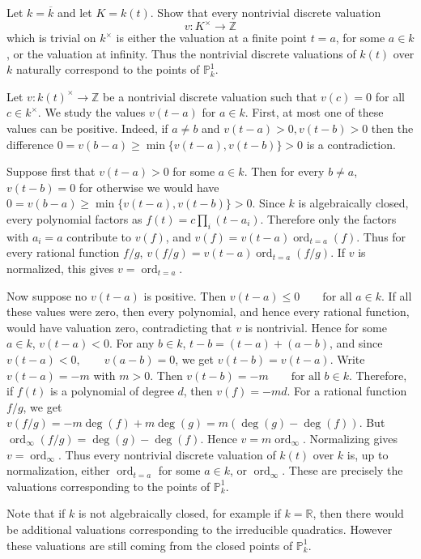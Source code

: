 \documentclass[12pt]{article}
\begin{document}
\begin{exercise}
    Let $k=\overline{k}$ and let $K=k(t)$. Show that every nontrivial discrete valuation
    \[
        v:K^\times\to \mathbb Z
    \]
    which is trivial on $k^\times$ is either the valuation at a finite point $t=a$, for some $a\in k$, or the valuation at infinity. Thus the nontrivial discrete valuations of $k(t)$ over $k$ naturally correspond to the points of $\mathbb P^1_k$.
\end{exercise}

\begin{solution}
    Let $v:k(t)^\times\to \mathbb{Z}$ be a nontrivial discrete valuation such that $v(c)=0$ for all $c\in k^\times$. We study the values $v(t-a)$ for $a\in k$. First, at most one of these values can be positive. Indeed, if $a\neq b$ and $v(t-a)>0, v(t-b)>0$ then the difference $0=v(b-a)\geq \min\{v(t-a),v(t-b)\}>0$ is a contradiction.

    Suppose first that $v(t-a)>0$ for some $a\in k$. Then for every $b\neq a$, $v(t-b)=0$ for otherwise we would have $0=v(b-a)\geq \min\{v(t-a),v(t-b)\}>0$. Since $k$ is algebraically closed, every polynomial factors as $f(t)=c\prod_i(t-a_i)$. Therefore only the factors with $a_i=a$ contribute to $v(f)$, and $v(f)=v(t-a)\operatorname{ord}_{t=a}(f)$. Thus for every rational function $f/g$, $v(f/g)=v(t-a)\operatorname{ord}_{t=a}(f/g)$. If $v$ is normalized, this gives $v=\operatorname{ord}_{t=a}$.

    Now suppose no $v(t-a)$ is positive. Then $v(t-a)\leq 0 \qquad \text{for all } a\in k$. If all these values were zero, then every polynomial, and hence every rational function, would have valuation zero, contradicting that $v$ is nontrivial. Hence for some $a\in k$, $v(t-a)<0$. For any $b\in k$, $t-b=(t-a)+(a-b)$, and since $v(t-a)<0, \qquad v(a-b)=0$, we get $v(t-b)=v(t-a)$. Write $v(t-a)=-m$ with $m>0$. Then $v(t-b)=-m \qquad \text{for all } b\in k$. Therefore, if $f(t)$ is a polynomial of degree $d$, then $v(f)=-md$. For a rational function $f/g$, we get $v(f/g)=-m\deg(f)+m\deg(g)=m(\deg(g)-\deg(f))$. But $\operatorname{ord}_\infty(f/g)=\deg(g)-\deg(f)$. Hence $v=m\operatorname{ord}_\infty$. Normalizing gives $v=\operatorname{ord}_\infty$. Thus every nontrivial discrete valuation of $k(t)$ over $k$ is, up to normalization, either $\operatorname{ord}_{t=a}$ for some $a\in k$, or $\operatorname{ord}_\infty$. These are precisely the valuations corresponding to the points of $\mathbb P^1_k$.
\end{solution}
Note that if $k$ is not algebraically closed, for example if $k=\mathbb R$, then there would be additional valuations corresponding to the irreducible quadratics. However these valuations are still coming from the closed points of $\mathbb P^1_k$.
\end{document}
